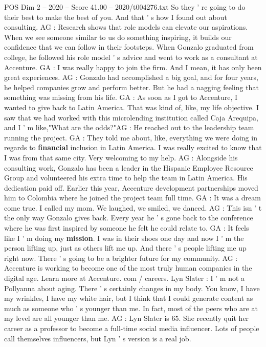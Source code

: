 \begin{textsample}{POS Dim 2 – 2020 – Score 41.00 – 2020/t004276.txt}
So they ' re going to do their best to make the best of you.
And that ' s how I found out about consulting.
AG : Research shows that role models can elevate our aspirations.
When we see someone similar to us do something inspiring, it builds our confidence that we can follow in their footsteps.
When Gonzalo graduated from college, he followed his role model ' s advice and went to work as a consultant at Accenture.
GA : I was really happy to join the firm.
And I mean, it has only been great experiences.
AG : Gonzalo had accomplished a big goal, and for four years, he helped companies grow and perform better.
But he had a nagging feeling that something was missing from his life.
GA : As soon as I got to Accenture, I wanted to give back to Latin America.
That was kind of, like, my life objective.
I saw that we had worked with this microlending institution called Caja Arequipa, and I ' m like,"What are the odds?"AG : He reached out to the leadership team running the project.
GA : They told me about, like, everything we were doing in regards to \textbf{financial} inclusion in Latin America.
I was really excited to know that I was from that same city.
Very welcoming to my help.
AG : Alongside his consulting work, Gonzalo has been a leader in the Hispanic Employee Resource Group and volunteered his extra time to help the team in Latin America.
His dedication paid off.
Earlier this year, Accenture development partnerships moved him to Colombia where he joined the project team full time.
GA : It was a dream come true.
I called my mom.
We laughed, we smiled, we danced.
AG : This isn ' t the only way Gonzalo gives back.
Every year he ' s gone back to the conference where he was first inspired by someone he felt he could relate to.
GA : It feels like I ' m doing my \textbf{mission}.
I was in their shoes one day and now I ' m the person lifting up, just as others lift me up.
And there ' s people lifting me up right now.
There ' s going to be a brighter future for my community.
AG : Accenture is working to become one of the most truly human companies in the digital age.
Learn more at Accenture. com / careers.
Lyn Slater : I ' m not a Pollyanna about aging.
There ' s certainly changes in my body.
You know, I have my wrinkles, I have my white hair, but I think that I could generate content as much as someone who ' s younger than me.
In fact, most of the peers who are at my level are all younger than me.
AG : Lyn Slater is 65.
She recently quit her career as a professor to become a full-time social media influencer.
Lots of people call themselves influencers, but Lyn ' s version is a real job.

\end{textsample}
